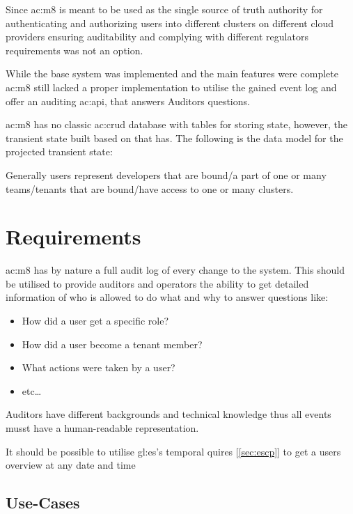 Since \gls{ac:m8} is meant to be used as the single source of truth authority for authenticating and authorizing users into different clusters on different cloud providers ensuring auditability and complying with different regulators requirements was not an option.

While the base system was implemented and the main features were complete \gls{ac:m8} still lacked a proper implementation to utilise the gained event log and offer an auditing \gls{ac:api}, that answers Auditors questions.

\Gls{ac:m8} has no classic \acrshort{ac:crud} database with tables for storing state, however, the transient state built based on that has. The following is the data model for the projected transient state:


Generally users represent developers that are bound/a part of one or many teams/tenants that are bound/have access to one or many clusters.

\section{Requirements}

\Gls{ac:m8} has by nature a full audit log of every change to the system. This should be utilised to provide auditors and operators the ability to get detailed information of who is allowed to do what and why to answer questions like:

\begin{itemize}
  \item How did a user get a specific role?
  \item How did a user become a tenant member?
  \item What actions were taken by a user?
  \item etc\dots
\end{itemize}

Auditors have different backgrounds and technical knowledge thus all events musst have a human-readable representation.

It should be possible to utilise \gls{gl:es}'s temporal quires [\ref{sec:escp}] to get a users overview at any date and time 

\subsection{Use-Cases}

